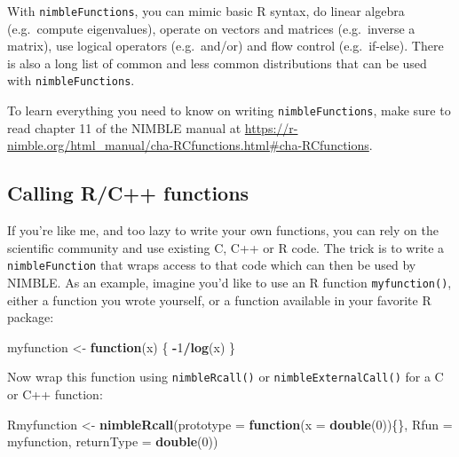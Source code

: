 \documentclass[
  12pt,
]{krantz}
\newenvironment{Shaded}{\begin{snugshade}}{\end{snugshade}}
\newcommand{\AttributeTok}[1]{\textcolor[rgb]{0.13,0.29,0.53}{#1}}
\newcommand{\ControlFlowTok}[1]{\textcolor[rgb]{0.13,0.29,0.53}{\textbf{#1}}}
\newcommand{\DecValTok}[1]{\textcolor[rgb]{0.00,0.00,0.81}{#1}}
\newcommand{\FunctionTok}[1]{\textcolor[rgb]{0.13,0.29,0.53}{\textbf{#1}}}
\newcommand{\NormalTok}[1]{#1}
\newcommand{\OtherTok}[1]{\textcolor[rgb]{0.56,0.35,0.01}{#1}}
\newcommand{\SpecialCharTok}[1]{\textcolor[rgb]{0.81,0.36,0.00}{\textbf{#1}}}
\newcommand{\StringTok}[1]{\textcolor[rgb]{0.31,0.60,0.02}{#1}}
\begin{document}
With \texttt{nimbleFunctions}, you can mimic basic R syntax, do linear algebra (e.g.~compute eigenvalues), operate on vectors and matrices (e.g.~inverse a matrix), use logical operators (e.g.~and/or) and flow control (e.g.~if-else). There is also a long list of common and less common distributions that can be used with \texttt{nimbleFunctions}.

To learn everything you need to know on writing \texttt{nimbleFunctions}, make sure to read chapter 11 of the NIMBLE manual at \url{https://r-nimble.org/html_manual/cha-RCfunctions.html\#cha-RCfunctions}.

\subsection{Calling R/C++ functions}\label{callrfninnimble}

If you're like me, and too lazy to write your own functions, you can rely on the scientific community and use existing C, C++ or R code. The trick is to write a \texttt{nimbleFunction} that wraps access to that code which can then be used by NIMBLE. As an example, imagine you'd like to use an R function \texttt{myfunction()}, either a function you wrote yourself, or a function available in your favorite R package:

\begin{Shaded}
\begin{Highlighting}[]
\NormalTok{myfunction }\OtherTok{\textless{}{-}} \ControlFlowTok{function}\NormalTok{(x) \{}
  \SpecialCharTok{{-}}\DecValTok{1}\SpecialCharTok{/}\FunctionTok{log}\NormalTok{(x)}
\NormalTok{\}}
\end{Highlighting}
\end{Shaded}

Now wrap this function using \texttt{nimbleRcall()} or \texttt{nimbleExternalCall()} for a C or C++ function:

\begin{Shaded}
\begin{Highlighting}[]
\NormalTok{Rmyfunction }\OtherTok{\textless{}{-}} \FunctionTok{nimbleRcall}\NormalTok{(}\AttributeTok{prototype =} \ControlFlowTok{function}\NormalTok{(}\AttributeTok{x =} \FunctionTok{double}\NormalTok{(}\DecValTok{0}\NormalTok{))\{\}, }
                           \AttributeTok{Rfun =} \StringTok{\textquotesingle{}myfunction\textquotesingle{}}\NormalTok{,}
                           \AttributeTok{returnType =} \FunctionTok{double}\NormalTok{(}\DecValTok{0}\NormalTok{))}
\end{Highlighting}
\end{Shaded}
\end{document}
